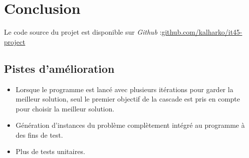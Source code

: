 \documentclass[11pt]{article}
\begin{document}
\newpage
\section{Conclusion}

Le code source du projet est disponible sur \emph{Github} :\newline \href{https://github.com/kalharko/it45-project}{github.com/kalharko/it45-project}

\subsection{Pistes d'amélioration}
\begin{itemize}
    \item Lorsque le programme est lancé avec plusieurs itérations pour garder la meilleur solution, seul le premier objectif de la cascade est pris en compte pour choisir la meilleur solution.
    \item Génération d'instances du problème complètement intégré au programme à des fins de test.
    \item Plus de tests unitaires.
\end{itemize}
\end{document}
